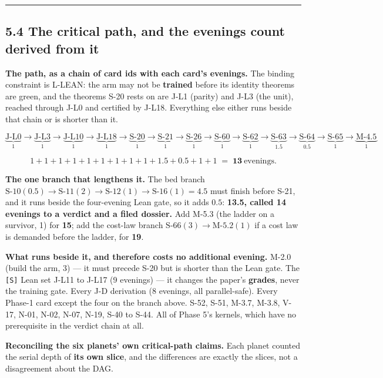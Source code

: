 \documentclass[11pt,a4paper]{article}
\theoremstyle{plain}
\theoremstyle{definition}
\theoremstyle{remark}
\begin{document}
\begin{center}\rule{0.5\linewidth}{0.5pt}\end{center}

\subsection{5.4 The critical path, and the evenings count derived from
it}\label{the-critical-path-and-the-evenings-count-derived-from-it}

\textbf{The path, as a chain of card ids with each card's evenings.} The
binding constraint is L-LEAN: the arm may not be \textbf{trained} before
its identity theorems are green, and the theorems S-20 rests on are J-L1
(parity) and J-L3 (the unit), reached through J-L0 and certified by
J-L18. Everything else either runs beside that chain or is shorter than
it.

\[ \underbrace{\text{J-L0}}_{1}\to\underbrace{\text{J-L3}}_{1}\to\underbrace{\text{J-L10}}_{1}\to \underbrace{\text{J-L18}}_{1}\to\underbrace{\text{S-20}}_{1}\to\underbrace{\text{S-21}}_{1}\to \underbrace{\text{S-26}}_{1}\to\underbrace{\text{S-60}}_{1}\to\underbrace{\text{S-62}}_{1}\to \underbrace{\text{S-63}}_{1.5}\to\underbrace{\text{S-64}}_{0.5}\to\underbrace{\text{S-65}}_{1}\to \underbrace{\text{M-4.5}}_{1}
\]

\[1+1+1+1+1+1+1+1+1+1.5+0.5+1+1 \;=\; \mathbf{13}\ \text{evenings.}\]

\textbf{The one branch that lengthens it.} The bed branch
\(\text{S-10}(0.5)\to\text{S-11}(2)\to\text{S-12}(1)\to\text{S-16}(1)=4.5\)
must finish before S-21, and it runs beside the four-evening Lean gate,
so it adds \(0.5\): \textbf{13.5, called 14 evenings to a verdict and a
filed dossier.} Add M-5.3 (the ladder on a survivor, 1) for \textbf{15};
add the cost-law branch \(\text{S-66}(3)\to\text{M-5.2}(1)\) if a cost
law is demanded before the ladder, for \textbf{19}.

\textbf{What runs beside it, and therefore costs no additional evening.}
M-2.0 (build the arm, 3) --- it must precede S-20 but is shorter than
the Lean gate. The \texttt{{[}S{]}} Lean set J-L11 to J-L17 (9 evenings)
--- it changes the paper's \textbf{grades}, never the training gate.
Every J-D derivation (8 evenings, all parallel-safe). Every Phase-1 card
except the four on the branch above. S-52, S-51, M-3.7, M-3.8, V-17,
N-01, N-02, N-07, N-19, S-40 to S-44. All of Phase 5's kernels, which
have no prerequisite in the verdict chain at all.

\textbf{Reconciling the six planets' own critical-path claims.} Each
planet counted the serial depth of \textbf{its own slice}, and the
differences are exactly the slices, not a disagreement about the DAG.
\end{document}

